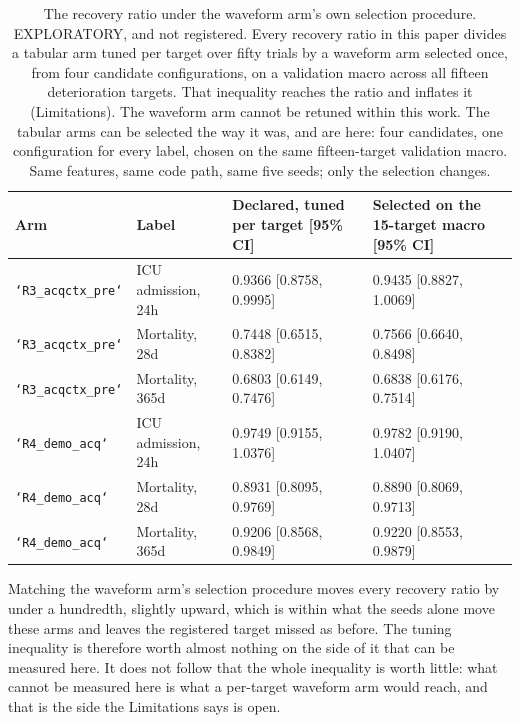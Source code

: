 \begin{table}[t]
\centering
\small
\caption{The recovery ratio under the waveform arm's own selection procedure. EXPLORATORY, and not registered. Every recovery ratio in this paper divides a tabular arm tuned per target over fifty trials by a waveform arm selected once, from four candidate configurations, on a validation macro across all fifteen deterioration targets. That inequality reaches the ratio and inflates it (Limitations). The waveform arm cannot be retuned within this work. The tabular arms can be selected the way it was, and are here: four candidates, one configuration for every label, chosen on the same fifteen-target validation macro. Same features, same code path, same five seeds; only the selection changes.}
\label{tab:sharedconfig}
\begin{tabular}{llll}
\toprule
Arm & Label & Declared, tuned per target [95\% CI] & Selected on the 15-target macro [95\% CI] \\
\midrule
\texttt{`R3\_acqctx\_pre`} & ICU admission, 24h & 0.9366 [0.8758, 0.9995] & 0.9435 [0.8827, 1.0069] \\
\texttt{`R3\_acqctx\_pre`} & Mortality, 28d & 0.7448 [0.6515, 0.8382] & 0.7566 [0.6640, 0.8498] \\
\texttt{`R3\_acqctx\_pre`} & Mortality, 365d & 0.6803 [0.6149, 0.7476] & 0.6838 [0.6176, 0.7514] \\
\texttt{`R4\_demo\_acq`} & ICU admission, 24h & 0.9749 [0.9155, 1.0376] & 0.9782 [0.9190, 1.0407] \\
\texttt{`R4\_demo\_acq`} & Mortality, 28d & 0.8931 [0.8095, 0.9769] & 0.8890 [0.8069, 0.9713] \\
\texttt{`R4\_demo\_acq`} & Mortality, 365d & 0.9206 [0.8568, 0.9849] & 0.9220 [0.8553, 0.9879] \\
\bottomrule
\end{tabular}
\par\footnotesize Matching the waveform arm's selection procedure moves every recovery ratio by under a hundredth, slightly upward, which is within what the seeds alone move these arms and leaves the registered target missed as before. The tuning inequality is therefore worth almost nothing on the side of it that can be measured here. It does not follow that the whole inequality is worth little: what cannot be measured here is what a per-target waveform arm would reach, and that is the side the Limitations says is open.
\end{table}


